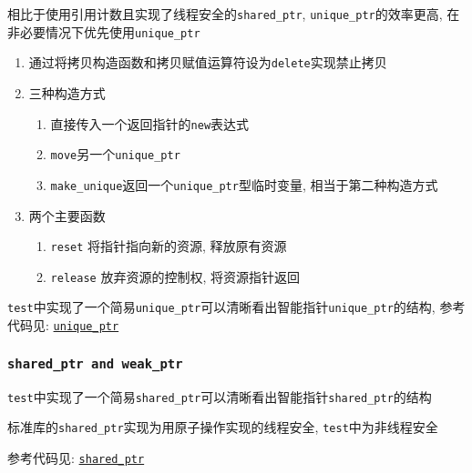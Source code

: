 相比于使用引用计数且实现了线程安全的{\tt shared\_ptr}, {\tt unique\_ptr}的效率更高, 在非必要情况下优先使用{\tt unique\_ptr}
\begin{enumerate}
	\item 通过将拷贝构造函数和拷贝赋值运算符设为{\tt delete}实现禁止拷贝
	\item 三种构造方式
	\begin{enumerate}
		\item 直接传入一个返回指针的{\tt new}表达式
		\item {\tt move}另一个{\tt unique\_ptr}
		\item {\tt make\_unique}返回一个{\tt unique\_ptr}型临时变量, 相当于第二种构造方式
	\end{enumerate}
	\item 两个主要函数
	\begin{enumerate}
		\item {\tt reset} 将指针指向新的资源, 释放原有资源
		\item {\tt release} 放弃资源的控制权, 将资源指针返回
	\end{enumerate}
\end{enumerate}
{\tt test}中实现了一个简易{\tt unique\_ptr}可以清晰看出智能指针{\tt unique\_ptr}的结构, 
	参考代码见: \href{https://github.com/wenqingqian/Obtuse/blob/main/test/cpp/c++11/smart_ptr/unique_ptr.h}{\tt unique\_ptr}
\subsubsection{\tt shared\_ptr and weak\_ptr}



{\tt test}中实现了一个简易{\tt shared\_ptr}可以清晰看出智能指针{\tt shared\_ptr}的结构

标准库的{\tt shared\_ptr}实现为用原子操作实现的线程安全, {\tt test}中为非线程安全

参考代码见: \href{https://github.com/wenqingqian/Obtuse/blob/main/test/cpp/c++11/smart_ptr/shared_ptr.h}{\tt shared\_ptr}

